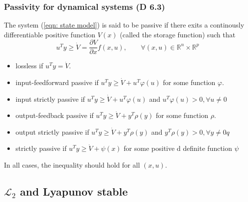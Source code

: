\documentclass{article}
\begin{document}
\subsubsection{Passivity for dynamical systems (D 6.3)}
The system (\ref{eqn: state model}) is said to be passive if there exits a continously differentiable positive function $V(x)$ (called the storage function) such that
\begin{equation}
	u^{T}y \geq \dot V =\frac{\partial V}{\partial x} f(x,u), \qquad \forall (x,u) \in  \mathbb{R}^{n} \times \mathbb{R}^p
\end{equation}
\begin{itemize}
	\item lossless if $u^T y=\dot{V}$.
	\item input-feedforward passive if $u^T y \geq \dot{V}+u^T \varphi(u)$ for some function $\varphi$.
\item input strictly passive if $u^T y \geq \dot{V}+u^T \varphi(u)$ and $u^T \varphi(u)>0, \forall u \neq 0$
\item output-feedback passive if $u^T y \geq \dot{V}+y^T \rho(y)$ for some function $\rho$.
\item output strictly passive if $u^T y \geq \dot{V}+y^T \rho(y)$ and $y^T \rho(y)>0, \forall y \ne 0q$
\item strictly passive if $u^T y \geq \dot{V}+\psi(x)$ for some positive d definite function $\psi $
\end{itemize}
In all cases, the inequality should hold for all $(x, u)$.
\subsection{$\mathcal{L}_2$ and Lyapunov stable}
\end{document}

